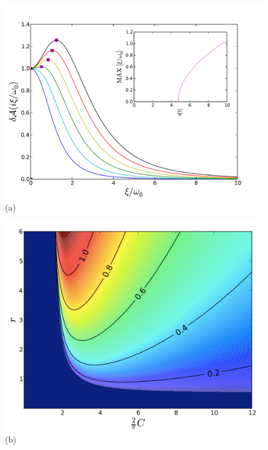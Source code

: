 \documentclass[letterpaper,twocolumn,amsmath,amssymb,floatfix,aps,superscriptaddress]{revtex4}
\begin{document}
\begin{figure}[t!]
\begin{center}
\begin{minipage}[b]{0.41\textwidth}
\begin{center}
\includegraphics[width=1.2\textwidth]{./130807_plots/130812_Hopkins_updated_fig_1a.pdf} (a)
\end{center}
\end{minipage}
\hskip 43pt
\begin{minipage}[b]{0.41\textwidth}
\begin{center}
\includegraphics[width=1.06\textwidth]{./130807_plots/fig1b_contour_xi_max-dilute.pdf} (b)

\end{center}
\end{minipage}
\end{center}
\end{figure}
\end{document}
